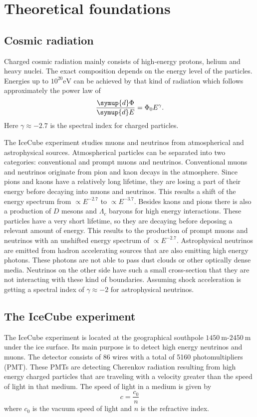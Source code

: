 \section{Theoretical foundations}
\label{sec:Theorie}
\subsection{Cosmic radiation}

Charged cosmic radiation mainly consists of high-energy protons, helium and heavy nuclei.
The exact composition depends on the energy level of the particles.
Energies up to $10^{20} \si{\electronvolt}$ can be achieved by that kind of radiation which follows approximately the power law of
\begin{equation*}
  \frac{\symup{d}\Phi}{\symup{d}E} = \Phi_0 E^{\gamma}.
\end{equation*}
Here $\gamma \approx -2.7$ is the spectral index for charged particles.

The IceCube experiment studies muons and neutrinos from atmospherical and astrophysical sources.
Atmospherical particles can be separated into two categories: conventional and prompt muons and neutrinos.
Conventional muons and neutrinos originate from pion and kaon decays in the atmosphere.
Since pions and kaons have a relatively long lifetime, they are losing a part of their energy before decaying into muons and neutrinos.
This results a shift of the energy spectrum from $\propto E^{-2.7}$ to $\propto E^{-3.7}$.
Besides kaons and pions there is also a production of $D$ mesons and $\Lambda_c$ baryons for high energy interactions.
These particles have a very short lifetime, so they are decaying before deposing a relevant amount of energy.
This results to the production of prompt muons and neutrinos with an unshifted energy spectrum of $\propto E^{-2.7}$.
Astrophysical neutrinos are emitted from hadron accelerating sources that are also emitting high energy photons.
These photons are not able to pass dust clouds or other optically dense media.
Neutrinos on the other side have such a small cross-section that they are not interacting with these kind of boundaries.
Assuming shock acceleration \cite{Fermi} is getting a spectral index of $\gamma \approx -2$ for astrophysical neutrinos.

\subsection{The IceCube experiment}
The IceCube experiment is located at the geographical southpole $\SI{1450}{\meter}$-$\SI{2450}{\meter}$ under the ice surface.
Its main purpose is to detect high energy neutrinos and muons.
The detector consists of 86 wires with a total of 5160 photomultipliers (PMT).
These PMTs are detecting Cherenkov radiation resulting from high energy charged particles that are traveling with a velocity greater than the speed of light in that medium.
The speed of light in a medium is given by
\begin{equation}
  c = \frac{c_0}{n}
\end{equation}
where $c_0$ is the vacuum speed of light and $n$ is the refractive index.

